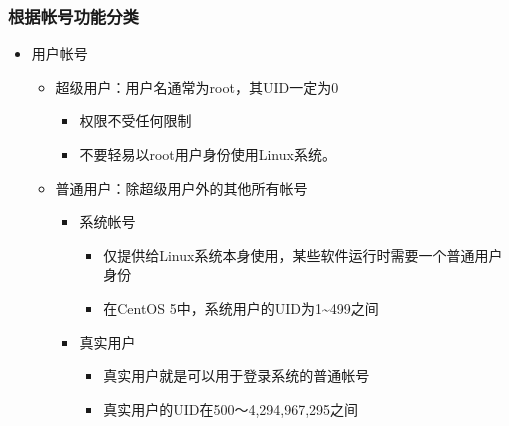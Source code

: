\documentclass[xcolor=svgnames,presentation]{beamer}
\begin{document}
\begin{frame}
\frametitle{根据帐号功能分类}
\label{sec-1-1-4}
\begin{itemize}

\item 用户帐号
\label{sec-1-1-4-1}%
\begin{itemize}

\item 超级用户：用户名通常为root，其UID一定为0
\label{sec-1-1-4-1-1}%
\begin{itemize}

\item 权限不受任何限制
\label{sec-1-1-4-1-1-1}%

\item 不要轻易以root用户身份使用Linux系统。
\label{sec-1-1-4-1-1-2}%
\end{itemize} %

\item 普通用户：除超级用户外的其他所有帐号
\label{sec-1-1-4-1-2}%
\begin{itemize}

\item 系统帐号
\label{sec-1-1-4-1-2-1}%
\begin{itemize}

\item 仅提供给Linux系统本身使用，某些软件运行时需要一个普通用户身份
\label{sec-1-1-4-1-2-1-1}%

\item 在CentOS 5中，系统用户的UID为1\~{}499之间
\label{sec-1-1-4-1-2-1-2}%
\end{itemize} %

\item 真实用户
\label{sec-1-1-4-1-2-2}%
\begin{itemize}

\item 真实用户就是可以用于登录系统的普通帐号
\label{sec-1-1-4-1-2-2-1}%

\item 真实用户的UID在500～4,294,967,295之间
\label{sec-1-1-4-1-2-2-2}%
\end{itemize} %
\end{itemize} %
\end{itemize} %
\end{itemize} %
\end{frame}
\end{document}
